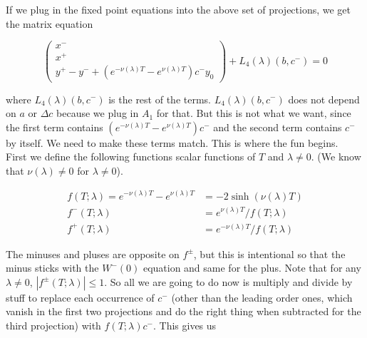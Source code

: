 \documentclass[12pt]{article}
\begin{document}
\begin{enumerate}
If we plug in the fixed point equations into the above set of projections, we get the matrix equation

\[
\begin{pmatrix}x^- \\ x^+ \\ y^+ - y^- + (e^{-\nu(\lambda)T} - e^{\nu(\lambda)T}) c^- y_0 \end{pmatrix} + L_4(\lambda)(b, c^-) = 0
\]

where $L_4(\lambda)(b, c^-)$ is the rest of the terms. $L_4(\lambda)(b, c^-)$ does not depend on $a$ or $\Delta c$ because we plug in $A_1$ for that. But this is not what we want, since the first term contains $(e^{-\nu(\lambda)T} - e^{\nu(\lambda)T}) c^-$ and the second term contains $c^-$ by itself. We need to make these terms match. This is where the fun begins.
\\

First we define the following functions scalar functions of $T$ and $\lambda \neq 0$. (We know that $\nu(\lambda) \neq 0$ for $\lambda \neq 0$).

\begin{align*}
f(T; \lambda) = e^{-\nu(\lambda)T} - e^{\nu(\lambda)T} &= -2 \sinh (\nu(\lambda) T) \\
f^-(T; \lambda) &= e^{\nu(\lambda)T} / f(T; \lambda) \\
f^+(T; \lambda) &= e^{-\nu(\lambda)T} / f(T; \lambda)
\end{align*}

The minuses and pluses are opposite on $f^\pm$, but this is intentional so that the minus sticks with the $W^-(0)$ equation and same for the plus. Note that for any $\lambda \neq 0$, $|f^\pm(T; \lambda)| \leq 1$. So all we are going to do now is multiply and divide by stuff to replace each occurrence of $c^-$ (other than the leading order ones, which vanish in the first two projections and do the right thing when subtracted for the third projection) with $f(T; \lambda) c^-$. This gives us


\end{enumerate}
\end{document}
